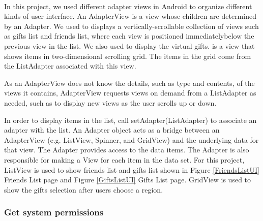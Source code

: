 \paragraph{}
In this project, we used different adapter views in Android to organize different kinds of user interface. An AdapterView is a view whose children are determined by an Adapter. We used  to displays a vertically-scrollable collection of views such as gifts list and friends list, where each view is positioned immediatelybelow the previous view in the list. We also used  to display the virtual gifts.  is a view that shows items in two-dimensional scrolling grid. The items in the grid come from the ListAdapter associated with this view. 
\par As an AdapterView does not know the details, such as type and contents, of the views it contains, AdapterView requests views on demand from a ListAdapter as needed, such as to display new views as the user scrolls up or down.
\par In order to display items in the list, call setAdapter(ListAdapter) to associate an adapter with the list. 
An Adapter object acts as a bridge between an AdapterView (e.g. ListView, Spinner, and GridView) and the underlying data for that view. The Adapter provides access to the data items. The Adapter is also responsible for making a View for each item in the data set. For this project, ListView is used to show friends list and gifts list shown in Figure \ref{FriendsListUI} Friends List page and Figure \ref{GiftsListUI} Gifts List page. GridView is used to show the gifts selection after users choose a region. 

\subsubsection{Get system permissions}
\label{subsubsec:GetSystemPermissions}
